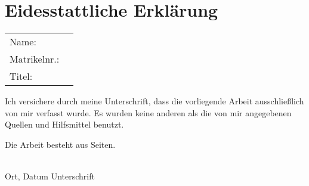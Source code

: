 
\section*{Eidesstattliche Erklärung}

\begin{table}[h]
\begin{tabularx}{\textwidth}{l X}
Name:			& \@author \\
Matrikelnr.:	& \Matrikelnummer \\
Titel:			& \@title 

				\titleEnglish \\
\end{tabularx}
\end{table}

Ich versichere durch meine Unterschrift, dass die vorliegende Arbeit
ausschließlich von mir verfasst wurde.
Es wurden keine anderen als die von mir angegebenen Quellen und Hilfsmittel
benutzt.

Die Arbeit besteht aus \underline{\hspace{3em}} Seiten.

\vspace{8ex}
\begin{tabbing}
\underline{\hspace{14em}} \hspace{3em}\= \underline{\hspace{14em}} \\
Ort, Datum \> Unterschrift
\end{tabbing}





\cleardoublepage




